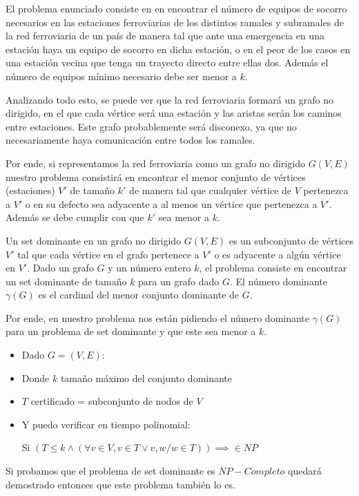 \documentclass[../tp3_grupo404.tex]{subfiles}
\begin{document}
El problema enunciado consiste en en encontrar el número de equipos de socorro necesarios en las estaciones 
ferroviarias de los distintos ramales y subramales de la red ferroviaria de un país de manera tal que ante 
una emergencia en una estación haya un equipo de socorro en dicha estación, o en el peor de los casos en 
una estación vecina que tenga un trayecto directo entre ellas dos. Además el número de equipos mínimo 
necesario debe ser menor a $k$.

Analizando todo esto, se puede ver que la red ferroviaria formará un grafo no dirigido, en el que cada 
vértice será una estación y las aristas serán los caminos entre estaciones. Este grafo probablemente 
será disconexo, ya que no necesariamente haya comunicación entre todos los ramales.

Por ende, si representamos la red ferroviaria como un grafo no dirigido $G(V,E)$ nuestro problema 
consistirá en encontrar el menor conjunto de vértices (estaciones) $V'$ de tamaño $k'$ de manera tal 
que cualquier vértice de $V$ pertenezca a $V'$ o en su defecto sea adyacente a al menos un vértice que 
pertenezca a $V'$. Además se debe cumplir con que $k'$ sea menor a $k$.

Un set dominante en un grafo no dirigido $G(V,E)$ es un subconjunto de vértices $V'$ tal que cada vértice 
en el grafo pertenece a $V'$ o es adyacente a algún vértice en $V'$. Dado un grafo $G$ y un número entero $k$, 
el problema consiste en encontrar un set dominante de tamaño $k$ para un grafo dado $G$. El número 
dominante $\gamma(G)$ es el cardinal del menor conjunto dominante de $G$.

Por ende, en nuestro problema nos están pidiendo el número dominante $\gamma(G)$ para un problema de set 
dominante y que este sea menor a $k$. 

\begin{itemize}
    \item Dado $G=(V,E)$:
    \item Donde $k$ tamaño máximo del conjunto dominante
    \item $T$ certificado = subconjunto de nodos de $V$
    \item Y puedo verificar en tiempo polinomial:

    Si $(T \leqslant k 	\land (	\forall v \in V, v \in T \lor {v,w} / w  \in T)) \implies \in NP$
\end{itemize}








Si probamos que el problema de set dominante es $NP-Completo$ quedará demostrado entonces que este problema también lo es.


\end{document}
